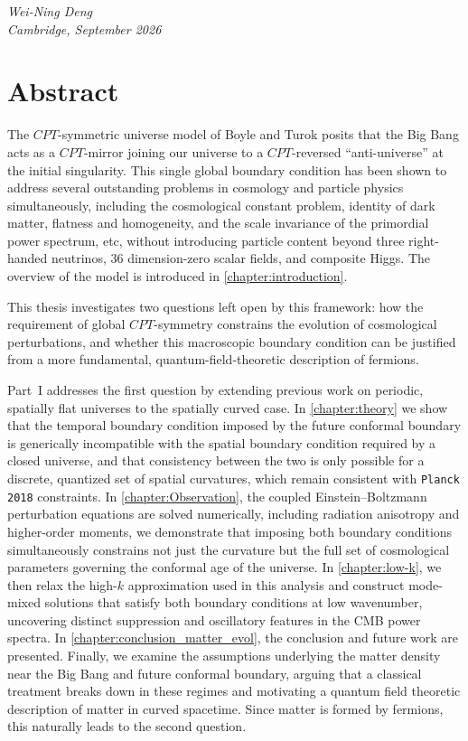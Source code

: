 \documentclass[12pt,a4paper]{report}
\begin{document}
\vspace{2.5cm}
\noindent\textit{Wei-Ning Deng}\\[0.3em]
\textit{Cambridge, September 2026}

\chapter*{Abstract}

The $CPT$-symmetric universe model of Boyle and Turok posits that the Big Bang acts as a $CPT$-mirror joining our universe to a $CPT$-reversed ``anti-universe'' at the initial singularity. This single global boundary condition has been shown to address several outstanding problems in cosmology and particle physics simultaneously, including the cosmological constant problem, identity of dark matter, flatness and homogeneity, and the scale invariance of the primordial power spectrum, etc, without introducing particle content beyond three right-handed neutrinos, 36 dimension-zero scalar fields, and composite Higgs. The overview of the model is introduced in \cref{chapter:introduction}. 

This thesis investigates two questions left open by this framework: how the requirement of global $CPT$-symmetry constrains the evolution of cosmological perturbations, and whether this macroscopic boundary condition can be justified from a more fundamental, quantum-field-theoretic description of fermions.

Part~I addresses the first question by extending previous work on periodic, spatially flat universes to the spatially curved case. In \cref{chapter:theory} we show that the temporal boundary condition imposed by the future conformal boundary is generically incompatible with the spatial boundary condition required by a closed universe, and that consistency between the two is only possible for a discrete, quantized set of spatial curvatures, which remain consistent with \texttt{Planck 2018} constraints. In \cref{chapter:Observation}, the coupled Einstein--Boltzmann perturbation equations are solved numerically, including radiation anisotropy and higher-order moments, we demonstrate that imposing both boundary conditions simultaneously constrains not just the curvature but the full set of cosmological parameters governing the conformal age of the universe. In \cref{chapter:low-k}, we then relax the high-$k$ approximation used in this analysis and construct mode-mixed solutions that satisfy both boundary conditions at low wavenumber, uncovering distinct suppression and oscillatory features in the CMB power spectra. In \cref{chapter:conclusion_matter_evol}, the conclusion and future work are presented. Finally, we examine the assumptions underlying the matter density near the Big Bang and future conformal boundary, arguing that a classical treatment breaks down in these regimes and motivating a quantum field theoretic description of matter in curved spacetime. Since matter is formed by fermions, this naturally leads to the second question.
\end{document}

